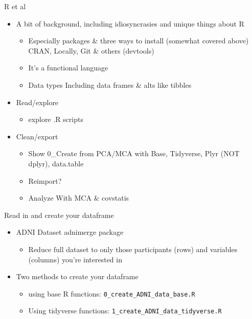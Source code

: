\documentclass[
  ignorenonframetext,
]{beamer}
\providecommand{\tightlist}{%
  \setlength{\itemsep}{0pt}\setlength{\parskip}{0pt}}
\begin{document}
\begin{frame}{R et al}
\protect\hypertarget{r-et-al-1}{}

\begin{itemize}
\tightlist
\item
  A bit of background, including idiosyncrasies and unique things about
  R

  \begin{itemize}
  \tightlist
  \item
    Especially packages \& three ways to install (somewhat covered
    above) CRAN, Locally, Git \& others (devtools)
  \item
    It's a functional language
  \item
    Data types Including data frames \& alts like tibbles
  \end{itemize}
\item
  Read/explore

  \begin{itemize}
  \tightlist
  \item
    explore .R scripts
  \end{itemize}
\item
  Clean/export

  \begin{itemize}
  \tightlist
  \item
    Show 0\_Create from PCA/MCA with Base, Tidyverse, Plyr (NOT dplyr),
    data.table
  \item
    Reimport?
  \item
    Analyze With MCA \& covstatis
  \end{itemize}
\end{itemize}

\end{frame}

\begin{frame}[fragile]{Read in and create your dataframe}
\protect\hypertarget{read-in-and-create-your-dataframe}{}

\begin{itemize}
\tightlist
\item
  ADNI Dataset adnimerge package

  \begin{itemize}
  \tightlist
  \item
    Reduce full dataset to only those participants (rows) and variables
    (columns) you're interested in
  \end{itemize}
\item
  Two methods to create your dataframe

  \begin{itemize}
  \tightlist
  \item
    using base R functions: \texttt{0\_create\_ADNI\_data\_base.R}
  \item
    Using tidyverse functions:
    \texttt{1\_create\_ADNI\_data\_tidyverse.R}
  \end{itemize}
\end{itemize}

\end{frame}
\end{document}
